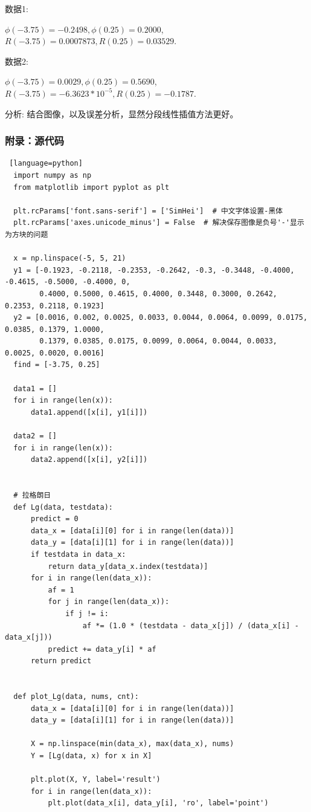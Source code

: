 \documentclass[UTF8]{ctexart}
\begin{document}
数据1:

$\phi(-3.75) = -0.2498 ,\phi(0.25) = 0.2000$,$R(-3.75)= 0.0007873, R(0.25) = 0.03529$.

数据2:

$\phi(-3.75) = 0.0029 ,\phi(0.25) = 0.5690$,$R(-3.75)= -6.3623*10^{-5}, R(0.25) = -0.1787$.

\quad

分析:
结合图像，以及误差分析，显然分段线性插值方法更好。
\subsubsection{附录：源代码}
\begin{lstlisting} [language=python]
  import numpy as np
  from matplotlib import pyplot as plt
  
  plt.rcParams['font.sans-serif'] = ['SimHei']  # 中文字体设置-黑体
  plt.rcParams['axes.unicode_minus'] = False  # 解决保存图像是负号'-'显示为方块的问题
  
  x = np.linspace(-5, 5, 21)
  y1 = [-0.1923, -0.2118, -0.2353, -0.2642, -0.3, -0.3448, -0.4000, -0.4615, -0.5000, -0.4000, 0,
        0.4000, 0.5000, 0.4615, 0.4000, 0.3448, 0.3000, 0.2642, 0.2353, 0.2118, 0.1923]
  y2 = [0.0016, 0.002, 0.0025, 0.0033, 0.0044, 0.0064, 0.0099, 0.0175, 0.0385, 0.1379, 1.0000,
        0.1379, 0.0385, 0.0175, 0.0099, 0.0064, 0.0044, 0.0033, 0.0025, 0.0020, 0.0016]
  find = [-3.75, 0.25]
  
  data1 = []
  for i in range(len(x)):
      data1.append([x[i], y1[i]])
  
  data2 = []
  for i in range(len(x)):
      data2.append([x[i], y2[i]])
  
  
  # 拉格朗日
  def Lg(data, testdata):
      predict = 0
      data_x = [data[i][0] for i in range(len(data))]
      data_y = [data[i][1] for i in range(len(data))]
      if testdata in data_x:
          return data_y[data_x.index(testdata)]
      for i in range(len(data_x)):
          af = 1
          for j in range(len(data_x)):
              if j != i:
                  af *= (1.0 * (testdata - data_x[j]) / (data_x[i] - data_x[j]))
          predict += data_y[i] * af
      return predict
  
  
  def plot_Lg(data, nums, cnt):
      data_x = [data[i][0] for i in range(len(data))]
      data_y = [data[i][1] for i in range(len(data))]
  
      X = np.linspace(min(data_x), max(data_x), nums)
      Y = [Lg(data, x) for x in X]
  
      plt.plot(X, Y, label='result')
      for i in range(len(data_x)):
          plt.plot(data_x[i], data_y[i], 'ro', label='point')
  

\end{lstlisting}
\end{document}
